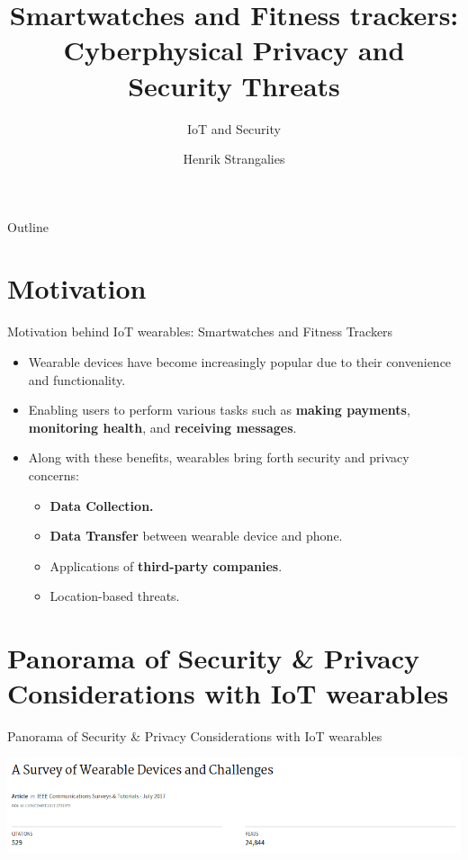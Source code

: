 \documentclass[ucs,9pt]{beamer}
\title[Short Paper Title] %
{Smartwatches and Fitness trackers: Cyberphysical Privacy and Security Threats}
\subtitle
{IoT and Security}
\author[Author, Another] %
{Henrik Strangalies} %
\institute[FU Berlin] %
{Freie Universität Berlin}
\begin{document}
\begin{frame}[plain]
  \titlepage
\end{frame}

\begin{frame}{Outline}
  \tableofcontents
\end{frame}

\section{Motivation}



\begin{frame}{Motivation behind IoT wearables: Smartwatches and Fitness Trackers}
  \begin{itemize}
  \item Wearable devices have become increasingly popular
   due to their convenience and functionality.
  \item Enabling users to perform various tasks such as \textbf{making payments}, \textbf{monitoring health}, and \textbf{receiving messages}.
  
  \pause 
  
  \item  Along with these benefits, wearables bring forth security and privacy concerns:
  \begin{itemize}
	\item \textbf{Data Collection.}
	\item \textbf{Data Transfer} between wearable device and phone.
	\item Applications of \textbf{third-party companies}.
	\item Location-based threats.
  \end{itemize}
  \end{itemize}
\end{frame}


\section{Panorama of Security \& Privacy Considerations with IoT wearables}

\begin{frame}[fragile]{Panorama of Security \& Privacy Considerations with IoT wearables}

\includegraphics[width=1\linewidth]{imgs/ASurveyofWearableDevicesandChallenges}

\end{frame}
\end{document}
